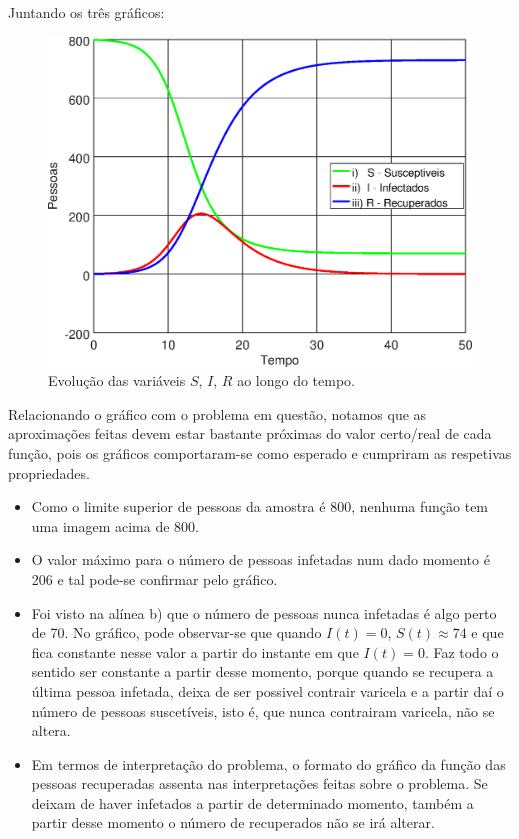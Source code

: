 \documentclass[portuguese, a4paper]{article}
\begin{document}
		\par
		Juntando os três gráficos:

		\begin{figure}[H]
			\centering
			\includegraphics[width=0.70\linewidth]{IIIc_fitted}
			\captionsetup{width=0.70\linewidth}
			\caption[Caption]{Evolução das variáveis $S$, $I$, $R$ ao longo do
			tempo.
			\footnotemark}
		\end{figure}

		\par
		Relacionando o gráfico com o problema em questão, notamos que as aproximações feitas devem estar
		bastante próximas do valor certo/real de cada função, pois os gráficos comportaram-se como esperado e cumpriram as respetivas propriedades.

		\begin{itemize}
		\item Como o limite superior de pessoas da amostra é 800, nenhuma função tem uma imagem acima de 800.
		\item O valor máximo para o número de pessoas infetadas num dado momento é 206 e tal pode-se confirmar pelo gráfico.
		\item Foi visto na alínea b) que o número de pessoas
		nunca infetadas é algo perto de 70. %
		No gráfico, pode observar-se que quando $I(t) = 0$, $S(t) \approx 74$ e que fica constante nesse valor a partir do instante em que $I(t) = 0$.
		Faz todo o sentido ser constante a partir desse momento, porque quando
		se recupera a última pessoa infetada, deixa de ser possivel contrair
		varicela e a partir daí o número de pessoas suscetíveis, isto é, que
		nunca contrairam varicela, não se altera.
		\item Em termos de interpretação do problema, o formato do gráfico da função das pessoas recuperadas assenta nas interpretações
		feitas sobre o problema. Se deixam de haver infetados a partir de determinado momento,
		também a partir desse momento o número de recuperados não se irá
		alterar.
		\end{itemize}
\end{document}
